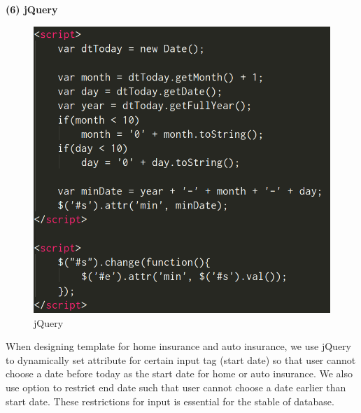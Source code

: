 \documentclass[12pt]{article}
\begin{document}
    \noindent\textbf{(6) jQuery}
    \begin{figure}[H]
    	\centering
    	\includegraphics[scale=0.32]{jquery.png}
    	\caption{jQuery}
    \end{figure}
    When designing template for home insurance and auto insurance, we use jQuery to dynamically set attribute for certain input tag (start date) so that user cannot choose a date before today as the start date for home or auto insurance. We also use option to restrict end date such that user cannot choose a date earlier than start date. These restrictions for input is essential for the stable of database.
    
\end{document}
